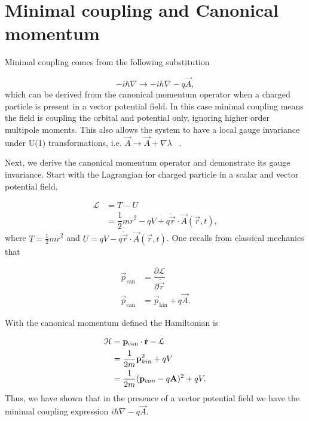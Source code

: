 \section{Minimal coupling and Canonical momentum}
Minimal coupling comes from the following substitution

\begin{equation}
  -i\hbar\nabla \rightarrow -ih\nabla - q\vec{A},
\end{equation}
which can be derived from the canonical momentum operator when a charged particle is present in a vector potential field.
In this case minimal coupling means the field is coupling the orbital and potential only, ignoring higher order multipole moments.
This also allows the system to have a local gauge invariance under U(1) transformations, i.e.
$\vec{A} \rightarrow \vec{A} + \nabla\lambda$  ~\cite{altlandCondensedMatterField2023}.

Next, we derive the canonical momentum operator and demonstrate its gauge invariance.
Start with the Lagrangian for charged particle in a scalar and vector potential field,

\begin{align}
  \mathcal{L} &= T- U \nonumber \\
  &= \dfrac{1}{2} m \dot{r}^2 - qV + q \dot{\vec{r}} \cdot \vec{A}(\vec{r},t),
\end{align}
where $T = \tfrac{1}{2} m \dot{r}^2$ and $U = qV - q \dot{\vec{r}} \cdot \vec{A}(\vec{r},t)$.
One recalls from classical mechanics that

\begin{align}
  \vec{p}_{\text{can}} &= \dfrac{\partial\mathcal{L}}{\partial \dot{\vec{r}}} \nonumber \\
  \vec{p}_{\text{can}} &= \vec{p}_{\text{kin}} + q \vec{A}.
  \label{eq:canonical-momentum}
\end{align}

With the canonical momentum defined the Hamiltonian is

\begin{align}
  \mathcal{H} &= \mathbf{p}_{\text{can}} \cdot \dot{\mathbf{r}} - \mathcal{L} \nonumber \\
  &= \dfrac{1}{2m}  \mathbf{p}_{kin}^2 + q V \nonumber \\
  &= \dfrac{1}{2m} (\mathbf{p}_{can} - q \mathbf{A})^2 + q V.
\end{align}
Thus, we have shown that in the presence of a vector potential field we have the minimal coupling expression
$i\hbar\nabla - q\vec{A}$.

